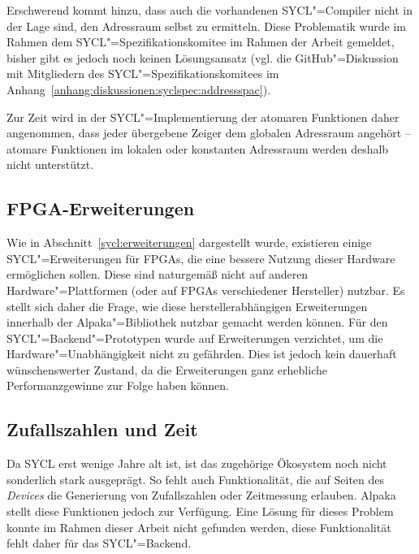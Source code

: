 Erschwerend kommt hinzu, dass auch die vorhandenen SYCL"=Compiler nicht in der
Lage sind, den Adressraum selbst zu ermitteln. Diese Problematik wurde im Rahmen
dem SYCL"=Spezifikationskomitee im Rahmen der Arbeit gemeldet, bisher gibt es
jedoch noch keinen Lösungsansatz (vgl. die GitHub"=Diskussion mit Mitgliedern
des SYCL"=Spezifikationskomitees im
Anhang~\ref{anhang:diskussionen:syclspec:addressspac}).

Zur Zeit wird in der SYCL"=Implementierung der atomaren Funktionen daher
angenommen, dass jeder übergebene Zeiger dem globalen Adressraum angehört --
atomare Funktionen im lokalen oder konstanten Adressraum werden deshalb nicht
unterstützt.

\subsection{FPGA-Erweiterungen}\label{implementierung:probleme:fpga}

Wie in Abschnitt~\ref{sycl:erweiterungen} dargestellt wurde, existieren einige
SYCL"=Erweiterungen für FPGAs, die eine bessere Nutzung dieser Hardware
ermöglichen sollen. Diese sind naturgemäß nicht auf anderen
Hardware"=Plattformen (oder auf FPGAs verschiedener Hersteller) nutzbar. Es
stellt sich daher die Frage, wie diese herstellerabhängigen Erweiterungen
innerhalb der Alpaka"=Bibliothek nutzbar gemacht werden können. Für den
SYCL"=Backend"=Prototypen wurde auf Erweiterungen verzichtet, um die
Hardware"=Unabhängigkeit nicht zu gefährden. Dies ist jedoch kein dauerhaft
wünschenswerter Zustand, da die Erweiterungen ganz erhebliche Performanzgewinne
zur Folge haben können.

\subsection{Zufallszahlen und Zeit}

Da SYCL erst wenige Jahre alt ist, ist das zugehörige Ökosystem noch nicht
sonderlich stark ausgeprägt. So fehlt auch Funktionalität, die auf Seiten des
\textit{Devices} die Generierung von Zufallszahlen oder Zeitmessung erlauben.
Alpaka stellt diese Funktionen jedoch zur Verfügung. Eine Lösung für dieses
Problem konnte im Rahmen dieser Arbeit nicht gefunden werden, diese
Funktionalität fehlt daher für das SYCL"=Backend.

